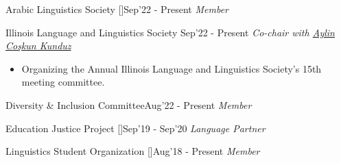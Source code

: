 
\begin{projects}
\projecta
	{Arabic Linguistics Society [\href{https://arabic-linguistics-society.uwm.edu/}{\small{\websiteSymbol}}]}{Sep'22 - Present}
	{
	    \textit{Member}
	}
	{\begin{itemize}
     
     \end{itemize}
     }
\projecta
	{Illinois Language and Linguistics Society \lbrack\href{https://ills.linguistics.illinois.edu/}{\small{\websiteSymbol}}\rbrack}{Sep'22 - Present}
	{
	    \textit{Co-chair with \href{https://aylinc2.github.io/}{Aylin Coşkun Kunduz}}
	}
	{\begin{itemize}
     \item Organizing the Annual Illinois Language and Linguistics Society's 15th meeting committee. 
     \end{itemize}}
     

 
     
\projecta
	{Diversity \& Inclusion Committee}{Aug'22 - Present}
	{
	    \textit{Member}
	}
	{\begin{itemize}
      
     \end{itemize}}

\projecta
	{Education Justice Project [\href{https://educationjustice.net/}{\small{\websiteSymbol}}]}{Sep'19 - Sep'20}
	{
	    \textit{Language Partner}
	}
	{\begin{itemize}
      
     \end{itemize}}
    \projecta
	{Linguistics Student Organization [\href{https://lso.linguistics.illinois.edu/}{\small{\websiteSymbol}}]}{Aug'18 - Present}
	{
	    \textit{Member} ~ 
	}
	{\begin{itemize}
     
     \end{itemize}}
\end{projects}
\vspace{-3mm}

